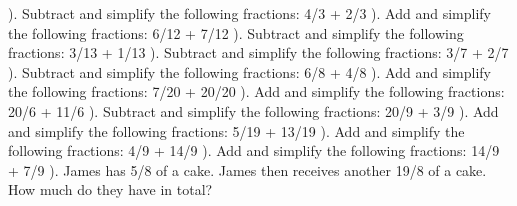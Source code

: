 \documentclass{article}%
\begin{document}
\newline%
\newline%
). Subtract and simplify the following fractions: 4/3 + 2/3%
\newline%
\newline%
). Add and simplify the following fractions: 6/12 + 7/12%
\newline%
\newline%
). Subtract and simplify the following fractions: 3/13 + 1/13%
\newline%
\newline%
). Subtract and simplify the following fractions: 3/7 + 2/7%
\newline%
\newline%
). Subtract and simplify the following fractions: 6/8 + 4/8%
\newline%
\newline%
). Add and simplify the following fractions: 7/20 + 20/20%
\newline%
\newline%
). Add and simplify the following fractions: 20/6 + 11/6%
\newline%
\newline%
). Subtract and simplify the following fractions: 20/9 + 3/9%
\newline%
\newline%
). Add and simplify the following fractions: 5/19 + 13/19%
\newline%
\newline%
). Add and simplify the following fractions: 4/9 + 14/9%
\newline%
\newline%
). Add and simplify the following fractions: 14/9 + 7/9%
\newline%
\newline%
). James has 5/8 of a cake. James then receives another 19/8 of a cake. How much do they have in total?%
\newline%
\end{document}
